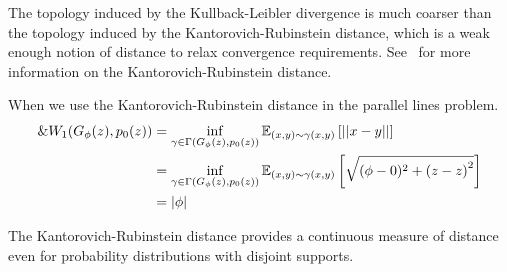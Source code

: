 The topology induced by the Kullback-Leibler divergence is much
coarser than the topology induced by the Kantorovich-Rubinstein
distance, which is a weak enough notion of distance to relax
convergence requirements. See~\cite{ref:villani-2008} for more
information on the Kantorovich-Rubinstein distance.

\begin{example}
  When we use the Kantorovich-Rubinstein distance in the parallel
  lines problem.
  \begin{align}
    \&W_1(G_\phi(z), p_0(z)) & = \inf_{\gamma \in
                           \Gamma(G_\phi(z),p_0(z))}\mathbb{E}_{(x,y) \sim
                           \gamma(x, y)} \left[ || x-y || \right] \\
                         & =\inf_{\gamma \in \Gamma(G_\phi(z),
                           p_0(z))}\mathbb{E}_{(x,y) \sim \gamma(x,
                           y)} \left[ \sqrt{(\phi - 0)^2 + {(z - z)}^2}
                           \right] \\
                         & =|\phi|
  \end{align}
\end{example}

The Kantorovich-Rubinstein distance provides a continuous measure of
distance even for probability distributions with disjoint supports.

